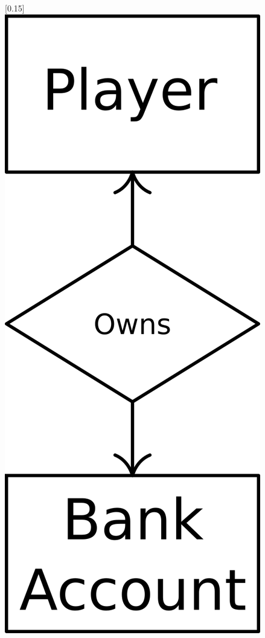 \documentclass[a4paper]{article}
\begin{document}
\begin{figure}[H]
[0.15\linewidth]{\centering\includegraphics[width=0.6\linewidth]{entity8.png}}
\end{figure}
\end{document}
